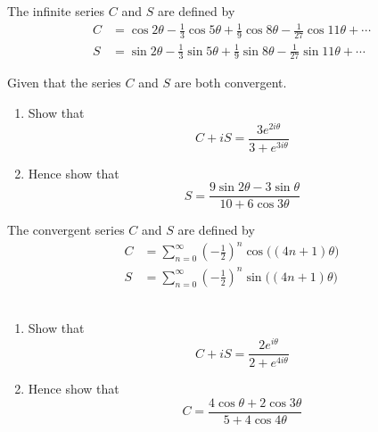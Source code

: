 \documentclass[leqno]{article}
\begin{document}
\djsFrontMatter
\begin{enumerate}[
  label=\textbf{\arabic*.},
  leftmargin=*,
  topsep=0pt,
  partopsep=0pt,
  parsep=0pt
]

\questionitem

The infinite series $C$ and $S$ are defined by
\begin{align*}
 C&= \cos 2\theta - \frac{1}{3}\cos 5\theta + \frac{1}{9}\cos 8\theta - \frac{1}{27}\cos 11\theta + \cdots \\[4pt]
S &= \sin 2\theta - \frac{1}{3}\sin 5\theta + \frac{1}{9}\sin 8\theta - \frac{1}{27}\sin 11\theta + \cdots  
\end{align*}

Given that the series $C$ and $S$ are both convergent. \\

\begin{enumerate}[label=\textbf{(\alph*)}]
  \item Show that
  \[
  C+ iS = \frac{3e^{2i\theta}}{3 + e^{3i\theta}}
  \]
  \item Hence show that
  \[
  S = \frac{9\sin 2\theta - 3\sin \theta}{10 + 6\cos 3\theta}
  \]
\end{enumerate}

\newpage


\questionitem

The convergent series $C$ and $S$ are defined by
\begin{align*}
C &= \sum_{n=0}^{\infty} \left(-\frac{1}{2}\right)^n \cos\bigl((4n+1)\theta\bigr)
\\[10pt]
S &= \sum_{n=0}^{\infty} \left(-\frac{1}{2}\right)^n \sin\bigl((4n+1)\theta\bigr)
\end{align*} \\
\begin{enumerate}[label=\textbf{(\alph*)}]
  \item Show that
  \[
  C + iS = \frac{2e^{i\theta}}{2 + e^{4i\theta}}
  \]
  \item Hence show that
  \[
  C = \frac{4\cos \theta + 2\cos 3\theta}{5 + 4\cos 4\theta}
  \]
\end{enumerate}

\newpage

\questionitem


\end{enumerate}
\end{document}
